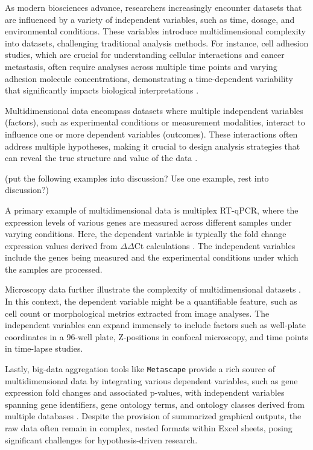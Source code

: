 

%
\label{sec:multidimensional_data}%
As modern biosciences advance, researchers increasingly encounter datasets that
are influenced by a variety of independent variables, such as time, dosage, and
environmental conditions. These variables introduce multidimensional complexity
into datasets, challenging traditional analysis methods. For instance, cell
adhesion studies, which are crucial for understanding cellular interactions and
cancer metastasis, often require analyses across multiple time points and
varying adhesion molecule concentrations, demonstrating a time-dependent
variability that significantly impacts biological interpretations
\cite{reblTimedependentMetabolicActivity2010, mckayCellcellAdhesionMolecules1997,bolado-carrancioPeriodicPropagatingWaves2020a}.

Multidimensional data encompass datasets where multiple independent variables
(factors), such as experimental conditions or measurement modalities, interact
to influence one or more dependent variables (outcomes). These interactions
often address multiple hypotheses, making it crucial to design analysis
strategies that can reveal the true structure and value of the data
\cite{krzywinskiMultidimensionalData2013}.

(put the following examples into discussion? Use one example, rest into discussion?)

A primary example of multidimensional data is multiplex RT-qPCR, where the
expression levels of various genes are measured across different samples under
varying conditions. Here, the dependent variable is typically the fold change
expression values derived from $\Delta\Delta$Ct calculations
\cite{brankatschkSimpleAbsoluteQuantification2012}. The independent variables
include the genes being measured and the experimental conditions under which the
samples are processed.

Microscopy data further illustrate the complexity of multidimensional datasets
\cite{ruedenImageJ2ImageJNext2017}. In this context, the dependent variable
might be a quantifiable feature, such as cell count or morphological metrics
extracted from image analyses. The independent variables can expand immensely to
include factors such as well-plate coordinates in a 96-well plate, Z-positions
in confocal microscopy, and time points in time-lapse studies.

Lastly, big-data aggregation tools like \texttt{Metascape} provide a rich source
of multidimensional data by integrating various dependent variables, such as
gene expression fold changes and associated p-values, with independent variables
spanning gene identifiers, gene ontology terms, and ontology classes derived from
multiple databases \cite{zhouMetascapeProvidesBiologistoriented2019}. Despite
the provision of summarized graphical outputs, the raw data often remain in
complex, nested formats within Excel sheets, posing significant challenges for
hypothesis-driven research.

